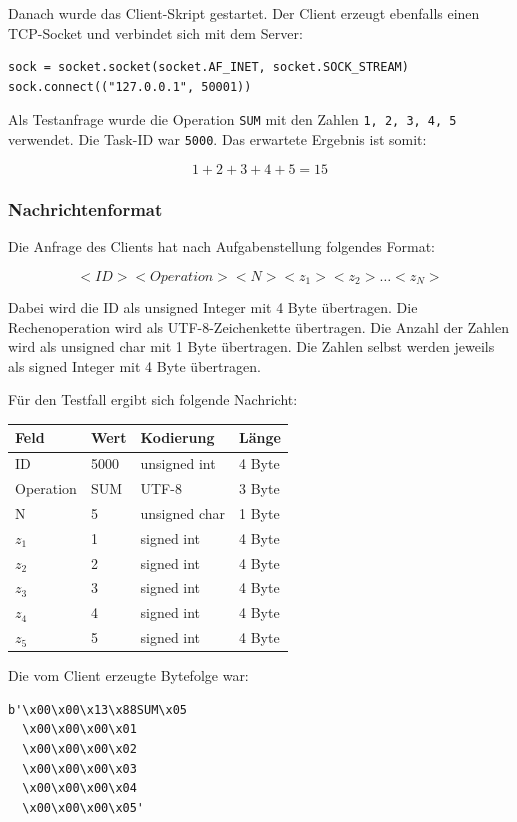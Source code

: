 \documentclass{kdiartcl}
\begin{document}
Danach wurde das Client-Skript gestartet. Der Client erzeugt ebenfalls einen TCP-Socket
und verbindet sich mit dem Server:

\begin{verbatim}
sock = socket.socket(socket.AF_INET, socket.SOCK_STREAM)
sock.connect(("127.0.0.1", 50001))
\end{verbatim}

Als Testanfrage wurde die Operation \texttt{SUM} mit den Zahlen
\texttt{1, 2, 3, 4, 5} verwendet. Die Task-ID war \texttt{5000}. Das erwartete Ergebnis
ist somit:

\[
1 + 2 + 3 + 4 + 5 = 15
\]

\subsubsection{Nachrichtenformat}

Die Anfrage des Clients hat nach Aufgabenstellung folgendes Format:

\[
<ID><Operation><N><z_1><z_2>\dots<z_N>
\]

Dabei wird die ID als unsigned Integer mit 4 Byte übertragen. Die Rechenoperation wird
als UTF-8-Zeichenkette übertragen. Die Anzahl der Zahlen wird als unsigned char mit
1 Byte übertragen. Die Zahlen selbst werden jeweils als signed Integer mit 4 Byte
übertragen.

Für den Testfall ergibt sich folgende Nachricht:

\begin{center}
\begin{tabular}{|l|l|l|l|}
\hline
Feld & Wert & Kodierung & Länge \\
\hline
ID & 5000 & unsigned int & 4 Byte \\
Operation & SUM & UTF-8 & 3 Byte \\
N & 5 & unsigned char & 1 Byte \\
$z_1$ & 1 & signed int & 4 Byte \\
$z_2$ & 2 & signed int & 4 Byte \\
$z_3$ & 3 & signed int & 4 Byte \\
$z_4$ & 4 & signed int & 4 Byte \\
$z_5$ & 5 & signed int & 4 Byte \\
\hline
\end{tabular}
\end{center}

Die vom Client erzeugte Bytefolge war:

\begin{verbatim}
b'\x00\x00\x13\x88SUM\x05
  \x00\x00\x00\x01
  \x00\x00\x00\x02
  \x00\x00\x00\x03
  \x00\x00\x00\x04
  \x00\x00\x00\x05'
\end{verbatim}
\end{document}
